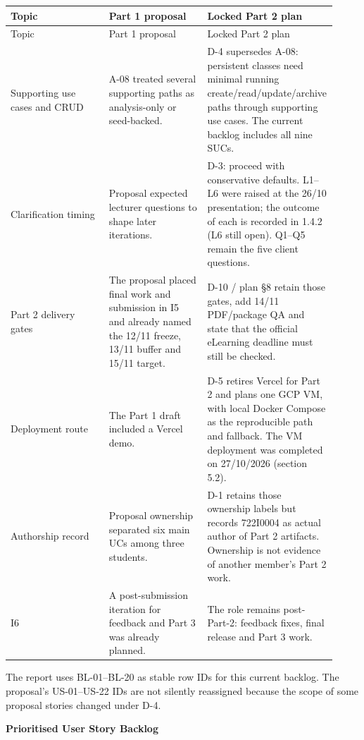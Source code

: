 \begin{longtable}{>{\raggedright\arraybackslash}p{0.3067\linewidth}>{\raggedright\arraybackslash}p{0.3067\linewidth}>{\raggedright\arraybackslash}p{0.3067\linewidth}}
Topic & Part 1 proposal & Locked Part 2 plan \\
\hline\endfirsthead
Topic & Part 1 proposal & Locked Part 2 plan \\
\hline\endhead
Supporting use cases and CRUD & A-08 treated several supporting paths as analysis-only or seed-backed. & D-4 supersedes A-08: persistent classes need minimal running create/read/update/archive paths through supporting use cases. The current backlog includes all nine SUCs. \\
Clarification timing & Proposal expected lecturer questions to shape later iterations. & D-3: proceed with conservative defaults. L1--L6 were raised at the 26/10 presentation; the outcome of each is recorded in 1.4.2 (L6 still open). Q1--Q5 remain the five client questions. \\
Part 2 delivery gates & The proposal placed final work and submission in I5 and already named the 12/11 freeze, 13/11 buffer and 15/11 target. & D-10 / plan \S{}8 retain those gates, add 14/11 PDF/package QA and state that the official eLearning deadline must still be checked. \\
Deployment route & The Part 1 draft included a Vercel demo. & D-5 retires Vercel for Part 2 and plans one GCP VM, with local Docker Compose as the reproducible path and fallback. The VM deployment was completed on 27/10/2026 (section 5.2). \\
Authorship record & Proposal ownership separated six main UCs among three students. & D-1 retains those ownership labels but records 722I0004 as actual author of Part 2 artifacts. Ownership is not evidence of another member's Part 2 work. \\
I6 & A post-submission iteration for feedback and Part 3 was already planned. & The role remains post-Part-2: feedback fixes, final release and Part 3 work. \\
\end{longtable}
The report uses BL-01--BL-20 as stable row IDs for this current backlog. The proposal's US-01--US-22 IDs are not silently reassigned because the scope of some proposal stories changed under D-4.

\textbf{Prioritised User Story Backlog}

